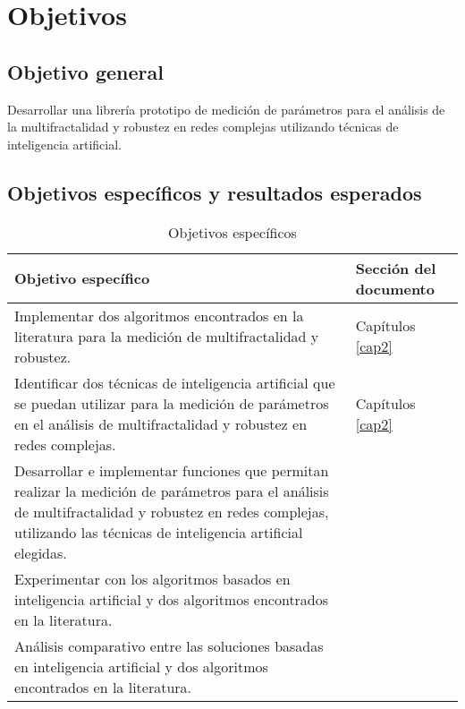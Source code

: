\section{Objetivos}

\subsection{Objetivo general}

Desarrollar una librería prototipo de medición de parámetros para el análisis de la multifractalidad y robustez en redes complejas utilizando técnicas de inteligencia artificial.

\subsection{Objetivos espec\'ificos y resultados esperados}

\begin{table}[H]
    \centering
    \begin{tabular}{|p{11cm}|p{4cm}|}
        \hline
        \textbf{Objetivo específico} & \textbf{Sección del documento} \\
        \hline
        Implementar dos algoritmos encontrados en la literatura para la medición de multifractalidad y robustez.& Capítulos \ref{cap2}\\
        \hline
        Identificar dos técnicas de inteligencia artificial que se puedan utilizar para la medición de parámetros en el análisis de multifractalidad y robustez en redes complejas.&  Capítulos \ref{cap2}\\
        \hline
         Desarrollar e implementar funciones que
permitan realizar la medición de parámetros para el análisis de multifractalidad y robustez en redes complejas, utilizando las técnicas de inteligencia artificial elegidas. & \\
        \hline
         Experimentar con los algoritmos basados
en inteligencia artificial y dos algoritmos
encontrados en la literatura.&  \\
        \hline
        Análisis comparativo entre las soluciones basadas en inteligencia artificial y dos algoritmos encontrados en la literatura.  & \\
        \hline
    \end{tabular}
    \caption{Objetivos específicos}
    \label{tab:objEspecificos}
\end{table}







